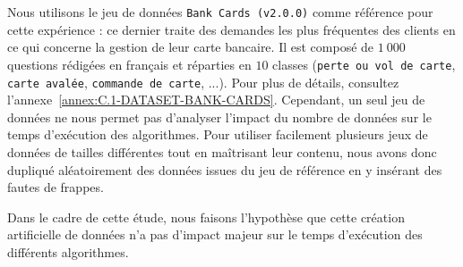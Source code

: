 			Nous utilisons le jeu de données \texttt{Bank Cards (v2.0.0)} comme référence pour cette expérience : ce dernier traite des demandes les plus fréquentes des clients en ce qui concerne la gestion de leur carte bancaire.
			Il est composé de $1~000$ questions rédigées en français et réparties en $10$ classes (\texttt{perte ou vol de carte}, \texttt{carte avalée}, \texttt{commande de carte}, ...).
			Pour plus de détails, consultez l'annexe~\ref{annex:C.1-DATASET-BANK-CARDS}.
			Cependant, un seul jeu de données ne nous permet pas d'analyser l'impact du nombre de données sur le temps d'exécution des algorithmes.
			Pour utiliser facilement plusieurs jeux de données de tailles différentes tout en maîtrisant leur contenu, nous avons donc dupliqué aléatoirement des données issues du jeu de référence en y insérant des fautes de frappes.
			
			\begin{leftBarWarning}
				Dans le cadre de cette étude, nous faisons l'hypothèse que cette création artificielle de données n'a pas d'impact majeur sur le temps d'exécution des différents algorithmes.
			\end{leftBarWarning}
			
